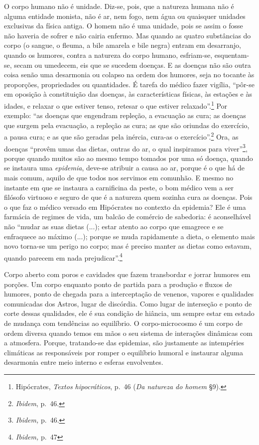 O corpo humano não é unidade. Diz-se, pois, que a natureza humana não é
alguma entidade monista, não é ar, nem fogo, nem água ou quaisquer
unidades exclusivas da física antiga. O homem não é uma unidade, pois se
assim o fosse não haveria de sofrer e não cairia enfermo. Mas quando as
quatro substâncias do corpo (o sangue, o fleuma, a bile amarela e bile
negra) entram em desarranjo, quando os humores, contra a natureza do
corpo humano, esfriam-se, esquentam-se, secam ou umedecem, eis que se
sucedem doenças. E as doenças não são outra coisa senão uma desarmonia
ou colapso na ordem dos humores, seja no tocante às proporções,
propriedades ou quantidades. É tarefa do médico fazer vigília, ``pôr-se
em oposição à constituição das doenças, às características físicas, às
estações e às idades, e relaxar o que estiver tenso, retesar o que
estiver relaxado''.\footnote{Hipócrates, \emph{Textos hipocráticos},
  p.~46 (\emph{Da natureza do homem} §9).} Por exemplo: ``as doenças que
engendram repleção, a evacuação as cura; as doenças que surgem pela
evacuação, a repleção as cura; as que são oriundas do exercício, a pausa
cura; e as que são geradas pela inércia, cura-as o
exercício''.\footnote{\emph{Ibidem}, p.~46.} Ora, as doenças ``provêm
umas das dietas, outras do ar, o qual inspiramos para viver''\footnote{\emph{Ibidem,}
  p.~46.}, porque quando muitos são ao mesmo tempo tomados por uma só
doença, quando se instaura uma \emph{epidemia}, deve-se atribuir a causa
ao ar, porque é o que há de mais comum, aquilo de que todos nos servimos
em comunhão. E mesmo no instante em que se instaura a carnificina da
peste, o bom médico vem a ser filósofo virtuoso e seguro de que é a
natureza quem sozinha cura as doenças. Pois o que faz o médico versado
em Hipócrates no contexto da epidemia? Ele é uma farmácia de regimes de
vida, um balcão de comércio de sabedoria: é aconselhável não ``mudar as
suas dietas (...); estar atento ao corpo que emagrece e se enfraquece ao
máximo (...); porque se muda rapidamente a dieta, o elemento mais novo
torna-se um perigo no corpo; mas é preciso manter as dietas como
estavam, quando parecem em nada prejudicar''.\footnote{\emph{Ibidem,}
  p.~47}

Corpo aberto com poros e cavidades que fazem transbordar e jorrar
humores em porções. Um corpo enquanto ponto de partida para a produção e
fluxos de humores, ponto de chegada para a interceptação de venenos,
vapores e qualidades comunicadas dos Astros, lugar de discórdia. Como
lugar de interseção e ponto de corte dessas qualidades, ele é sua
condição de hiância, um sempre estar em estado de mudança com tendências
ao equilíbrio. O corpo-microcosmo é um corpo de ordem diversa quando
temos em mãos o seu sistema de interações dinâmicas com a atmosfera.
Porque, tratando-se das epidemias, são justamente as intempéries
climáticas as responsáveis por romper o equilíbrio humoral e instaurar
alguma desarmonia entre meio interno e esferas envolventes.

